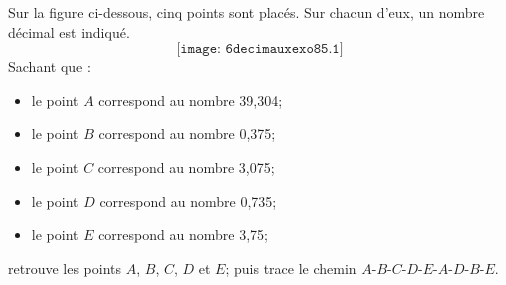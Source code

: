 Sur la figure ci-dessous, cinq points sont placés. Sur chacun d'eux, un
nombre décimal est indiqué.
\[\texttt{[image: 6decimauxexo85.1]}\]
Sachant que :
\begin{itemize}
\item le point $A$ correspond au nombre 39,304;
\item le point $B$ correspond au nombre 0,375;
\item le point $C$ correspond au nombre 3,075;
\item le point $D$ correspond au nombre 0,735;
\item le point $E$ correspond au nombre 3,75;
\end{itemize}
retrouve les points $A$, $B$, $C$, $D$ et $E$; puis trace
le chemin $A$-$B$-$C$-$D$-$E$-$A$-$D$-$B$-$E$.